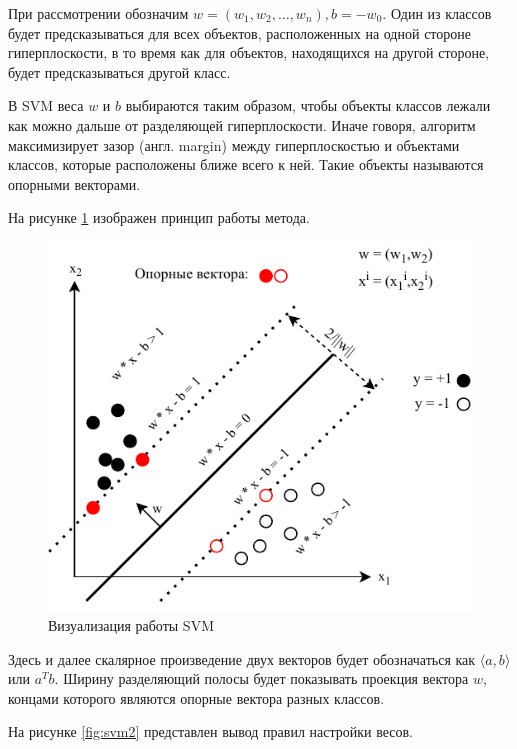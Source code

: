 При рассмотрении обозначим $w = (w_1, w_2, …, w_n), b=-w_0$. Один из классов будет предсказываться для всех объектов, расположенных на одной стороне гиперплоскости, в то время как для объектов, находящихся на другой стороне, будет предсказываться другой класс.

В SVM веса $w$ и $b$ выбираются таким образом, чтобы объекты классов лежали как можно дальше от разделяющей гиперплоскости. 
Иначе говоря, алгоритм максимизирует зазор (англ. margin) между гиперплоскостью и объектами классов, которые расположены ближе всего к ней. Такие объекты называются опорными векторами.


На рисунке \ref{fig:svm1} изображен принцип работы метода.

\begin{figure}[H]
	\centering
	\includegraphics[width=\textwidth]{../img/svm1.pdf}
	\caption{Визуализация работы SVM}
	\label{fig:svm1}
\end{figure}

Здесь и далее скалярное произведение двух векторов будет обозначаться как $\langle a,b\rangle$ или $a^Tb$. Ширину разделяющий полосы будет показывать проекция вектора $w$, концами которого являются опорные вектора разных классов.

На рисунке \ref{fig:svm2} представлен вывод правил настройки весов.

